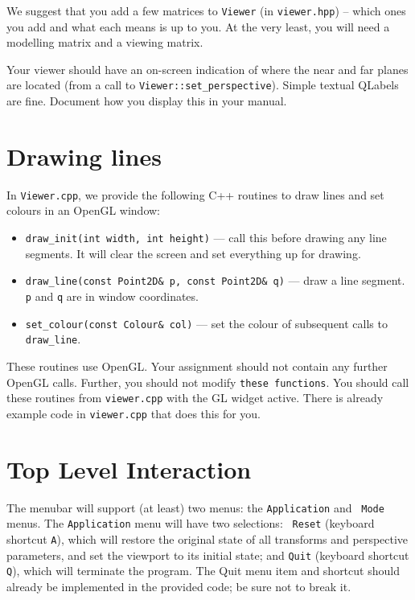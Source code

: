 We suggest that you add a few matrices to \texttt{Viewer} (in
\texttt{viewer.hpp}) -- which ones you add and what each means is up
to you. At the very least, you will need a modelling matrix and a
viewing matrix.

Your viewer should have an on-screen indication of where the near and
far planes are located (from a call to
\texttt{Viewer::set\_perspective}). Simple textual QLabels are
fine. Document how you display this in your manual.

\section{Drawing lines}

In {\tt Viewer.cpp}, we provide the following C++ routines to draw lines and
set colours in an OpenGL window:
\begin{itemize}
  \item {\tt draw\_init(int width, int height)} --- call this before
    drawing any line segments. It will clear the screen and set
    everything up for drawing.
  \item {\tt draw\_line(const Point2D\& p, const Point2D\& q)} --- draw a line
    segment.  {\tt p} and {\tt q} are in window coordinates.
  \item {\tt set\_colour(const Colour\& col)} --- set the colour of subsequent
    calls to \texttt{draw\_line}.
\end{itemize}

These routines use OpenGL.  Your assignment should not contain any
further OpenGL calls.  Further, you should not modify {\tt these functions}.
You should call these routines from \texttt{viewer.cpp}
with the GL widget active. There is already example code in
\texttt{viewer.cpp} that does this for you.

\section{Top Level Interaction}
The menubar will support (at least) two menus: the {\tt Application} and {\tt
Mode} menus.  The {\tt Application} menu will have two selections: {\tt
Reset} (keyboard shortcut {\tt A}), which will restore the original 
state of all transforms and perspective parameters, and set the viewport 
to its initial state; and {\tt Quit} (keyboard shortcut {\tt Q}), which will 
terminate the program.  The Quit menu item and shortcut should already
be implemented in the provided code; be sure not to break it.

